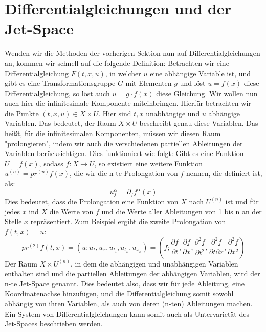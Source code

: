 \documentclass[a4paper]{article}
\begin{document}
\section{Differentialgleichungen und der Jet-Space}
Wenden wir die Methoden der vorherigen Sektion nun auf Differentialgleichungen an, kommen wir schnell auf die folgende Definition: Betrachten wir eine Differentialgleichung $F(t,x,u)$,  in welcher $u$ eine abhängige Variable ist, und gibt es eine Transformationsgruppe $G$ mit Elementen $g$ und löst $u=f(x)$ diese Differentialgleichung, so löst auch $u=g\cdot f(x)$ diese Gleichung.
\newline
Wir wollen nun auch hier die infinitesimale Komponente miteinbringen. Hierfür betrachten wir die Punkte $(t,x,u)\in X\times U$. Hier sind $t,x$ unabhängige und $u$ abhängige Variablen. Das bedeutet, der Raum $X\times U$ beschreibt genau diese Variablen. Das heißt, für die infinitesimalen Komponenten, müssen wir diesen Raum "prolongieren", indem wir auch die verschiedenen partiellen Ableitungen der Variablen berücksichtigen. Dies funktioniert wie folgt: Gibt es eine Funktion $U=f(x)$, sodass $f: X\rightarrow U$, so existiert eine weitere Funktion $u^{(n)}=pr^{(n)}f(x)$, die wir die n-te Prolongation von $f$ nennen, die definiert ist, als:
\begin{equation}
    u^\alpha_f=\partial_f f^\alpha(x)
\end{equation}
Dies bedeutet, dass die Prolongation eine Funktion von $X$ nach $U^{(n)}$ ist und für jedes $x$ ind $X$ die Werte von $f$ und die Werte aller Ableitungen von 1 bis n an der Stelle $x$ repräsentiert. Zum Beispiel ergibt die zweite Prolongation von $f(t,x)=u$:
\begin{equation}
    pr^{(2)}f(t,x)=(u;u_t,u_x,u_t_t,u_t_x,u_x_x)=(f;\frac{\partial f}{\partial t},\frac{\partial f}{\partial x}, \frac{\partial^2 f}{\partial t^2},\frac{\partial^2 f}{\partial t\partial x},\frac{\partial^2 f}{\partial x^2})
\end{equation}
Der Raum $X\times U^{(n)}$, in dem die abhängigen und unabhängigen Variablen enthalten sind und die partiellen Ableitungen der abhängigen Variablen, wird der n-te Jet-Space genannt.
\newline
Dies bedeutet also, dass wir für jede Ableitung, eine Koordinatenachse hinzufügen, und die Differentialgleichung somit sowohl abhängig von ihren Variablen, als auch von deren (n-ten) Ableitungen machen. Ein System von Differentialgleichungen kann somit auch als Untervarietät des Jet-Spaces beschrieben werden.
\end{document}
